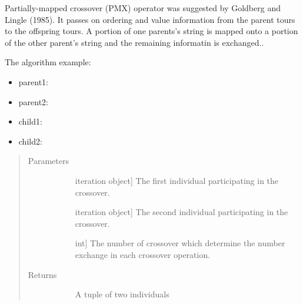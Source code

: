 \documentclass[letterpaper,10pt,english]{sphinxmanual}
\begin{document}
\begin{fulllineitems}
\label{\detokenize{pygace:pygace.ga.partial_mapped_crossover}}
Partially-mapped crossover (PMX) operator was suggested by Goldberg and
Lingle (1985). It passes on ordering and value information from the
parent tours to the offspring tours. A portion of one parents’s string
is mapped onto a portion of the other parent’s string and the remaining
informatin is exchanged..

The algorithm example:
\begin{itemize}
\item {} 
parent1: 

\item {} 
parent2: 

\item {} 
child1: 

\item {} 
child2: 

\end{itemize}
\begin{quote}\begin{description}
\item[{Parameters}] \leavevmode\begin{description}
\item[{}] \leavevmode{[}iteration object{]}
The first individual participating in the crossover.

\item[{}] \leavevmode{[}iteration object{]}
The second individual participating in the crossover.

\item[{}] \leavevmode{[}int{]}
The number of crossover which determine the number exchange in each
crossover operation.

\end{description}

\item[{Returns}] \leavevmode\begin{description}
\item[{}] \leavevmode
A tuple of two individuals


\end{description}
\end{description}
\end{quote}
\end{fulllineitems}
\end{document}
